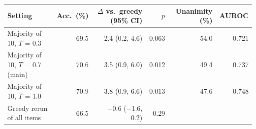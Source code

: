 \begin{tabular}{@{}lrrrrr@{}}
\toprule
Setting & Acc.\ (\%) & $\Delta$ vs.\ greedy (95\% CI) & $p$ & Unanimity (\%) & AUROC \\
\midrule
Majority of 10, $T$ = 0.3 & 69.5 & 2.4 (0.2, 4.6) & 0.063 & 54.0 & 0.721 \\
Majority of 10, $T$ = 0.7 (main) & 70.6 & 3.5 (0.9, 6.0) & 0.012 & 49.4 & 0.737 \\
Majority of 10, $T$ = 1.0 & 70.9 & 3.8 (0.9, 6.6) & 0.013 & 47.6 & 0.748 \\
Greedy rerun of all items & 66.5 & $-$0.6 ($-$1.6, 0.2) & 0.29 & -- & -- \\
\bottomrule
\end{tabular}
